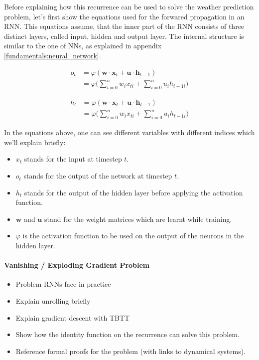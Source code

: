 Before explaining how this recurrence can be used to solve the weather prediction problem, let's first show the equations used for the forwared propagation in an RNN. This equations assume, that the inner part of the RNN consists of three distinct layers, called input, hidden and output layer. The internal structure is similar to the one of NNs, as explained in appendix \ref{fundamentals:neural_network}.

\begin{equation}
\begin{split}
o_t  & =  \varphi(\mathbf{w} \cdot \mathbf{x}_t + \mathbf{u} \cdot \mathbf{h}_{t-1}) \\
& = \varphi\bigg(\sum_{i=0}^{n} w_i x_{ti} + \sum_{i=0}^{n} u_i h_{t-1i}\bigg)
\end{split}
\label{fundamentals:rnn:forward_equation:hidden}
\end{equation}


\begin{equation}
\begin{split}
h_t  & =  \varphi(\mathbf{w} \cdot \mathbf{x}_t + \mathbf{u} \cdot \mathbf{h}_{t-1}) \\
     & = \varphi\bigg(\sum_{i=0}^{n} w_i x_{ti} + \sum_{i=0}^{n} u_i h_{t-1i}\bigg)
\end{split}
\label{fundamentals:rnn:forward_equation:output}
\end{equation}

In the equations above, one can see different variables with different indices which we'll explain briefly:

\begin{itemize}[noitemsep]
	\item $x_t$ stands for the input at timestep $t$.
	\item $o_t$ stands for the output of the network at timestep $t$.
	\item $h_t$ stands for the output of the hidden layer before applying the activation function.
	\item $\mathbf{w}$ and $\mathbf{u}$ stand for the weight matrices which are learnt while training.
	\item $\varphi$ is the activation function to be used on the output of the neurons in the hidden layer.
\end{itemize}

\paragraph{Vanishing / Exploding Gradient Problem}
\begin{itemize}
	\item Problem RNNs face in practice
	\item Explain unrolling briefly
	\item Explain gradient descent with TBTT
	\item Show how the identity function on the recurrence can solve this problem.
	\item Reference formal proofs for the problem (with links to dynamical systems).
\end{itemize}

